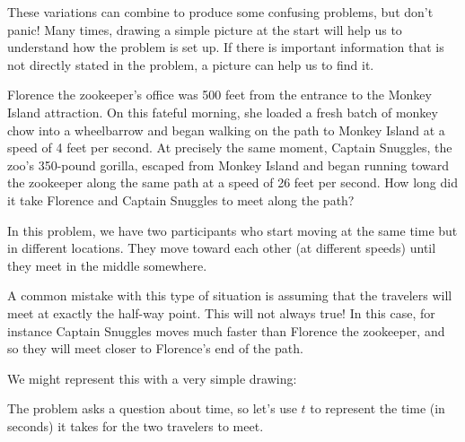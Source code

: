 These variations can combine to produce some confusing problems, but don't panic! Many times, drawing a simple picture at the start will help us to understand how the problem is set up. If there is important information that is not directly stated in the problem, a picture can help us to find it.

\begin{boxex}
Florence the zookeeper's office was 500 feet from the entrance to the Monkey Island attraction. On this fateful morning, she loaded a fresh batch of monkey chow into a wheelbarrow and began walking on the path to Monkey Island at a speed of 4 feet per second. At precisely the same moment, Captain Snuggles, the zoo's 350-pound gorilla, escaped from Monkey Island and began running toward the zookeeper along the same path at a speed of 26 feet per second. How long did it take Florence and Captain Snuggles to meet along the path?
\end{boxex}

In this problem, we have two participants who start moving at the same time but in different locations. They move toward each other (at different speeds) until they meet in the middle somewhere.

A common mistake with this type of situation is assuming that the travelers will meet at exactly the half-way point. This will not always true! In this case, for instance Captain Snuggles moves much faster than Florence the zookeeper, and so they will meet closer to Florence's end of the path.

We might represent this with a very simple drawing:
\begin{center}%
\end{center}%

The problem asks a question about time, so let's use $t$ to represent the time (in seconds) it takes for the two travelers to meet.

